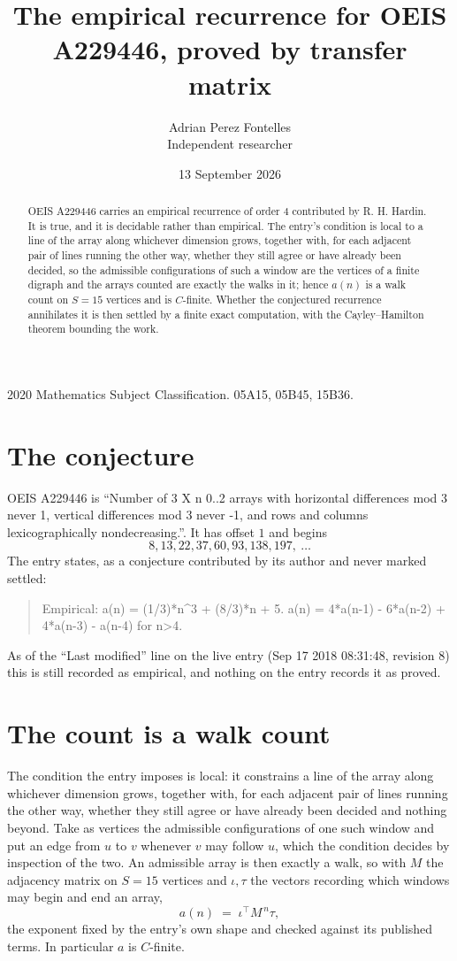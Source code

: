 \documentclass[11pt,a4paper]{article}
\title{The empirical recurrence for OEIS A229446, proved by transfer matrix}
\author{Adrian Perez Fontelles\\ \small Independent researcher}
\date{13 September 2026}
\theoremstyle{plain}
\theoremstyle{definition}
\begin{document}
\maketitle

\begin{abstract}
OEIS A229446 carries an empirical recurrence of order $4$ contributed by R. H. Hardin. It is
true, and it is decidable rather than empirical. The entry's condition is local to a line of the array along whichever dimension grows, together with, for each adjacent pair of lines running the other way, whether they still agree or have already been decided, so
the admissible configurations of such a window are the vertices of a finite digraph and the
arrays counted are exactly the walks in it; hence $a(n)$ is a walk count on $S=15$ vertices
and is $C$-finite. Whether the conjectured recurrence annihilates it is then settled by a
finite exact computation, with the Cayley--Hamilton theorem bounding the work.
\end{abstract}

\noindent\small 2020 Mathematics Subject Classification. 05A15, 05B45, 15B36.\normalsize

\section{The conjecture}

OEIS A229446 is ``Number of 3 X n 0..2 arrays with horizontal differences mod 3 never 1, vertical differences mod 3 never -1, and rows and columns lexicographically nondecreasing.''. It has offset $1$ and begins
\[
8, 13, 22, 37, 60, 93, 138, 197,\ \dots
\]
The entry states, as a conjecture contributed by its author and never marked settled:
\begin{quote}
Empirical: a(n) = (1/3)*n\^{}3 + (8/3)*n + 5. a(n) = 4*a(n-1) - 6*a(n-2) + 4*a(n-3) - a(n-4) for n>4.
\end{quote}
As of the ``Last modified'' line on the live entry (Sep 17 2018 08:31:48, revision 8) this is still
recorded as empirical, and nothing on the entry records it as proved.

\section{The count is a walk count}

The condition the entry imposes is local: it constrains a line of the array along whichever dimension grows, together with, for each adjacent pair of lines running the other way, whether they still agree or have already been decided and nothing beyond. Take as
vertices the admissible configurations of one such window and put an edge from $u$ to $v$
whenever $v$ may follow $u$, which the condition decides by inspection of the two. An
admissible array is then exactly a walk, so with $M$ the adjacency matrix on $S=15$ vertices
and $\iota,\tau$ the vectors recording which windows may begin and end an array,
\[
a(n)\;=\;\iota^{\!\top}M^{\,n}\tau ,
\]
the exponent fixed by the entry's own shape and checked against its published terms. In
particular $a$ is $C$-finite.
\end{document}
